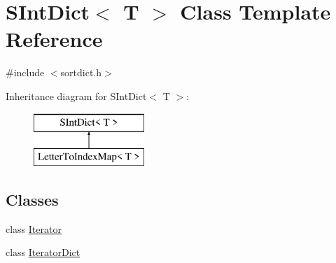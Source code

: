 \hypertarget{class_s_int_dict}{}\section{S\+Int\+Dict$<$ T $>$ Class Template Reference}
\label{class_s_int_dict}


{\ttfamily \#include $<$sortdict.\+h$>$}

Inheritance diagram for S\+Int\+Dict$<$ T $>$\+:\begin{figure}[H]
\begin{center}
\leavevmode
\includegraphics[height=2.000000cm]{class_s_int_dict}
\end{center}
\end{figure}
\subsection*{Classes}
\begin{DoxyCompactItemize}
\item 
class \mbox{\hyperlink{class_s_int_dict_1_1_iterator}{Iterator}}
\item 
class \mbox{\hyperlink{class_s_int_dict_1_1_iterator_dict}{Iterator\+Dict}}
\end{DoxyCompactItemize}
